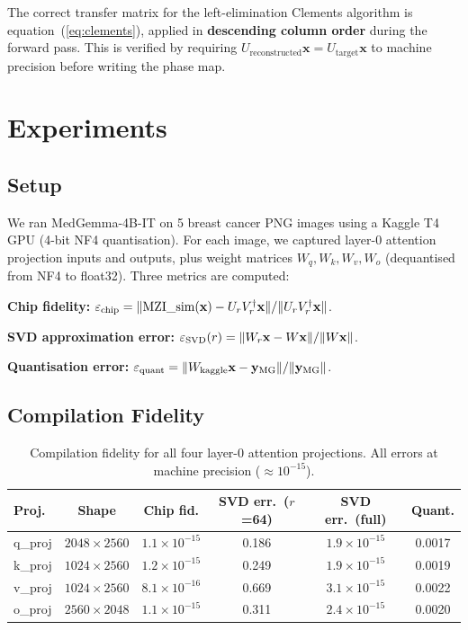\documentclass{article}
\begin{document}
The correct transfer matrix for the left-elimination Clements algorithm is
equation~(\ref{eq:clements}), applied in \textbf{descending column order}
during the forward pass.
This is verified by requiring $U_{\text{reconstructed}}\mathbf{x} = U_{\text{target}}\mathbf{x}$
to machine precision before writing the phase map.

\section{Experiments}

\subsection{Setup}

We ran MedGemma-4B-IT on 5 breast cancer PNG images using a Kaggle T4 GPU
(4-bit NF4 quantisation).
For each image, we captured layer-0 attention projection inputs and outputs,
plus weight matrices $W_q, W_k, W_v, W_o$ (dequantised from NF4 to float32).
Three metrics are computed:

\noindent \textbf{Chip fidelity:}
$\varepsilon_{\rm chip} = \|\text{MZI\_sim}(\mathbf{x}) - U_r V_r^\dagger\mathbf{x}\|
/ \|U_r V_r^\dagger\mathbf{x}\|$.

\noindent \textbf{SVD approximation error:}
$\varepsilon_{\rm SVD}(r) = \|W_r\mathbf{x} - W\mathbf{x}\| / \|W\mathbf{x}\|$.

\noindent \textbf{Quantisation error:}
$\varepsilon_{\rm quant} = \|W_{\rm kaggle}\mathbf{x} - \mathbf{y}_{\rm MG}\|
/ \|\mathbf{y}_{\rm MG}\|$.

\subsection{Compilation Fidelity}

\begin{table}[h]
\centering
\caption{Compilation fidelity for all four layer-0 attention projections.
         All errors at machine precision ($\approx 10^{-15}$).}
\label{tab:fidelity}
\begin{tabular}{lccccc}
\toprule
\textbf{Proj.} & \textbf{Shape} & \textbf{Chip fid.} & \textbf{SVD err.\ ($r$=64)} &
\textbf{SVD err.\ (full)} & \textbf{Quant.} \\
\midrule
q\_proj & $2048{\times}2560$ & $1.1\!\times\!10^{-15}$ & 0.186 & $1.9\!\times\!10^{-15}$ & 0.0017 \\
k\_proj & $1024{\times}2560$ & $1.2\!\times\!10^{-15}$ & 0.249 & $1.9\!\times\!10^{-15}$ & 0.0019 \\
v\_proj & $1024{\times}2560$ & $8.1\!\times\!10^{-16}$ & 0.669 & $3.1\!\times\!10^{-15}$ & 0.0022 \\
o\_proj & $2560{\times}2048$ & $1.1\!\times\!10^{-15}$ & 0.311 & $2.4\!\times\!10^{-15}$ & 0.0020 \\
\bottomrule
\end{tabular}
\end{table}
\end{document}
